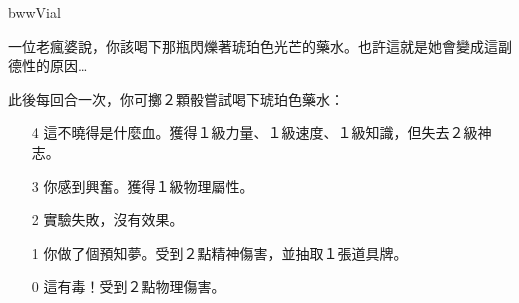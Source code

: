 \begin{OmenCard}{bww}{Vial}{}
	\begin{CardStory}
		一位老瘋婆說，你該喝下那瓶閃爍著琥珀色光芒的藥水。也許這就是她會變成這副德性的原因…
	\end{CardStory}
	此後每回合一次，你可擲２顆骰嘗試喝下琥珀色藥水：
	\begin{itemize}
		\item[4] 這不曉得是什麼血。獲得１級力量、１級速度、１級知識，但失去２級神志。
		\item[3] 你感到興奮。獲得１級物理屬性。
		\item[2] 實驗失敗，沒有效果。
		\item[1] 你做了個預知夢。受到２點精神傷害，並抽取１張道具牌。
		\item[0] 這有毒！受到２點物理傷害。
	\end{itemize}
\end{OmenCard}%
\linebreak[0]%
